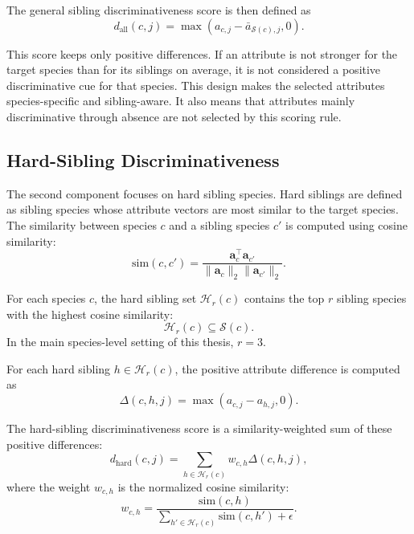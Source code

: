 The general sibling discriminativeness score is then defined as
\begin{equation}
    d_{\mathrm{all}}(c,j)
    =
    \max
    \left(
        a_{c,j} - \bar{a}_{\mathcal{S}(c),j},
        0
    \right).
\end{equation}

This score keeps only positive differences. If an attribute is not stronger for the target species than for its siblings on average, it is not considered a positive discriminative cue for that species. This design makes the selected attributes species-specific and sibling-aware. It also means that attributes mainly discriminative through absence are not selected by this scoring rule.

\subsection{Hard-Sibling Discriminativeness}

The second component focuses on hard sibling species. Hard siblings are defined as sibling species whose attribute vectors are most similar to the target species. The similarity between species \(c\) and a sibling species \(c'\) is computed using cosine similarity:
\begin{equation}
    \mathrm{sim}(c,c')
    =
    \frac{
        \mathbf{a}_c^\top \mathbf{a}_{c'}
    }{
        \|\mathbf{a}_c\|_2 \|\mathbf{a}_{c'}\|_2
    }.
\end{equation}

For each species \(c\), the hard sibling set \(\mathcal{H}_r(c)\) contains the top \(r\) sibling species with the highest cosine similarity:
\begin{equation}
    \mathcal{H}_r(c)
    \subseteq
    \mathcal{S}(c).
\end{equation}
In the main species-level setting of this thesis, \(r=3\).

For each hard sibling \(h \in \mathcal{H}_r(c)\), the positive attribute difference is computed as
\begin{equation}
    \Delta(c,h,j)
    =
    \max(a_{c,j} - a_{h,j}, 0).
\end{equation}

The hard-sibling discriminativeness score is a similarity-weighted sum of these positive differences:
\begin{equation}
    d_{\mathrm{hard}}(c,j)
    =
    \sum_{h \in \mathcal{H}_r(c)}
    w_{c,h}
    \Delta(c,h,j),
\end{equation}
where the weight \(w_{c,h}\) is the normalized cosine similarity:
\begin{equation}
    w_{c,h}
    =
    \frac{
        \mathrm{sim}(c,h)
    }{
        \sum_{h' \in \mathcal{H}_r(c)}
        \mathrm{sim}(c,h') + \epsilon
    }.
\end{equation}


